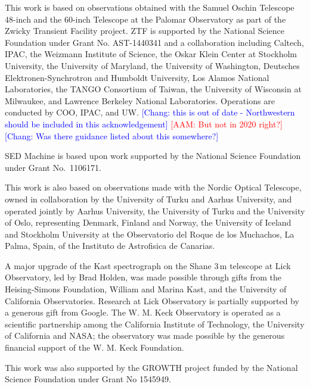 \documentclass[twocolumn]{aastex631}
\newcommand{\adam}[1]{\textcolor{red}{[AAM: #1]}}
\newcommand{\chang}[1]{\textcolor{blue}{[Chang: #1]}}
\begin{document}
This work is based on observations obtained with the Samuel Oschin Telescope 48-inch and the 60-inch Telescope at the Palomar Observatory as part of the Zwicky Transient Facility project. ZTF is supported by the National Science Foundation under Grant No. AST-1440341 and a collaboration including Caltech, IPAC, the Weizmann Institute of Science, the Oskar Klein Center at Stockholm University, the University of Maryland, the University of Washington, Deutsches Elektronen-Synchrotron and Humboldt University, Los Alamos National Laboratories, the TANGO Consortium of Taiwan, the University of Wisconsin at Milwaukee, and Lawrence Berkeley National Laboratories. Operations are conducted by COO, IPAC, and UW. \chang{this is out of date - Northwestern should be included in this acknowledgement} \adam{But not in 2020 right?} \chang{Was there guidance listed about this somewhere?}

SED Machine is based upon work supported by the National Science Foundation under Grant No.\ 1106171.

This work is also based on observations made with the Nordic Optical Telescope, owned in collaboration by the University of Turku and Aarhus University, and operated jointly by Aarhus University, the University of Turku and the University of Oslo, representing Denmark, Finland and Norway, the University of Iceland and Stockholm University at the Observatorio del Roque de los Muchachos, La Palma, Spain, of the Instituto de Astrofisica de Canarias.

A major upgrade of the Kast spectrograph on the Shane 3\,m telescope at Lick Observatory, led by Brad Holden, was made possible through gifts from the Heising-Simons Foundation, William and Marina Kast, and the University of California Observatories. Research at Lick Observatory is partially supported by a generous gift from Google. The W. M. Keck Observatory is operated as a scientific partnership among the California Institute of Technology, the University of California and NASA; the observatory was made possible by the generous financial support of the W. M. Keck Foundation.

This work was also supported by the GROWTH project \citep{Kasliwal2019} funded by the National Science Foundation under Grant No 1545949.

\end{document}
